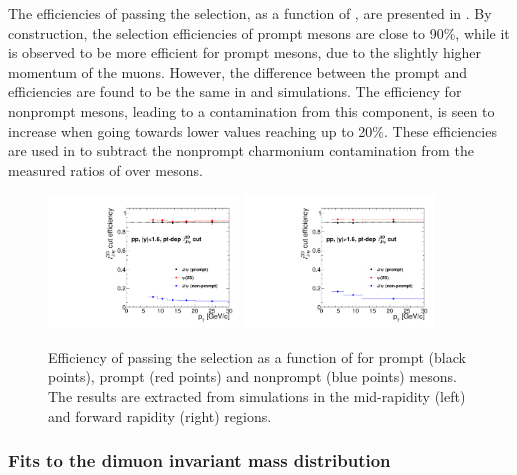 The efficiencies of passing the \ctau selection, as a function of \ptMuMu, are presented in  . By construction, the \ctau selection efficiencies of prompt \JPsi mesons are close to 90\%, while it is observed to be more efficient for prompt \PsiP mesons, due to the slightly higher momentum of the muons. However, the difference between the prompt \JPsi and \PsiP efficiencies are found to be the same in \Runpp and \RunPbPb simulations. The efficiency for nonprompt \JPsi mesons, leading to a contamination from this component, is seen  to increase when going towards lower \ptMuMu values reaching up to 20\%. These efficiencies are used in  to subtract the nonprompt charmonium contamination from the measured ratios of \PsiP over \JPsi mesons.

\begin{figure}[htb!]
 \centering
 \includegraphics[width=0.45\textwidth]{Figures/Charmonia/Analysis/PsiPSignalExtraction/CtauCut/ctaucuteff_pp_pt_mid_ptdepcut.pdf}
 \includegraphics[width=0.45\textwidth]{Figures/Charmonia/Analysis/PsiPSignalExtraction/CtauCut/ctaucuteff_pp_pt_fwd_ptdepcut.pdf}
 \caption{Efficiency of passing the \ctau selection as a function of \ptMuMu for prompt \JPsi (black points), prompt \PsiP (red points) and nonprompt \JPsi (blue points) mesons. The results are extracted from \Runpp simulations in the mid-rapidity (left) and forward rapidity (right) regions.}
 \label{fig:CtauCutEff}
\end{figure}


\subsubsection{Fits to the dimuon invariant mass distribution}\label{sec:Charmonia_Analysis_PsiPYieldExtraction_InvMass}


